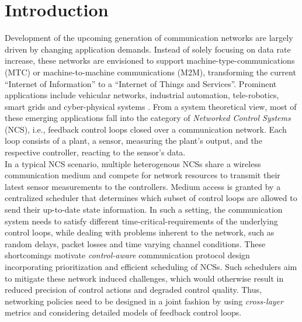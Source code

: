 \chapter{Introduction}


Development of the upcoming generation of communication networks are largely
driven by changing application demands. Instead of solely focusing on data rate
increase, these networks are envisioned to support machine-type-communications
(MTC) or machine-to-machine communications (M2M), transforming the current
``Internet of Information'' to a ``Internet of Things and Services''. Prominent
applications include vehicular networks, industrial automation, tele-robotics,
smart grids and cyber-physical systems \cite{murray2003future}. From a system
theoretical view, most of these emerging applications fall into the category of
\textit{Networked Control Systems} (NCS), i.e., feedback control loops closed
over a communication network. Each loop consists of a plant, a sensor, measuring
the plant's output, and the respective controller, reacting to the sensor's
data. \\
In a typical NCS scenario, multiple heterogenous NCSs share a wireless
communication medium and compete for network resources to transmit their latest
sensor measurements to the controllers. Medium access is granted by a
centralized scheduler that determines which subset of control loops are allowed
to send their up-to-date state information. In such a setting, the communication
system needs to satisfy different time-critical-requirements of the underlying
control loops, while dealing with problems inherent to the network, such as
random delays, packet losses and time varying channel conditions. These
shortcomings motivate \textit{control-aware} communication protocol design
incorporating prioritization and efficient scheduling of NCSs. Such schedulers
aim to mitigate these network induced challenges, which would otherwise result
in reduced precision of control actions and degraded control quality. Thus,
networking policies need to be designed in a joint fashion by using
\textit{cross-layer} metrics and considering detailed models of feedback control
loops. 


